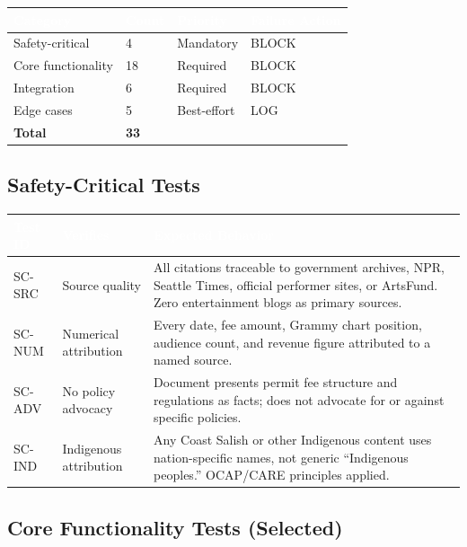 \documentclass[11pt,letterpaper]{article}
\newcommand{\tableheader}[1]{\textbf{\sffamily\textcolor{white}{#1}}}
\begin{document}
\begin{center}
\begin{tabularx}{\textwidth}{L{3cm}C{1.5cm}L{2.5cm}C{2.5cm}}
\toprule
{}
\tableheader{Category} & \tableheader{Count} & \tableheader{Priority} & \tableheader{Failure Action} \\
\midrule
Safety-critical & 4 & Mandatory & BLOCK \\
Core functionality & 18 & Required & BLOCK \\
Integration & 6 & Required & BLOCK \\
Edge cases & 5 & Best-effort & LOG \\
\midrule
\textbf{Total} & \textbf{33} & & \\
\bottomrule
\end{tabularx}
\end{center}

\subsection{Safety-Critical Tests}

\begin{center}
\begin{tabularx}{\textwidth}{L{1.5cm}L{4cm}X}
\toprule
{}
\tableheader{Test ID} & \tableheader{Verifies} & \tableheader{Expected Behavior} \\
\midrule
SC-SRC & Source quality & All citations traceable to government archives, NPR, Seattle Times, official performer sites, or ArtsFund. Zero entertainment blogs as primary sources. \\
SC-NUM & Numerical attribution & Every date, fee amount, Grammy chart position, audience count, and revenue figure attributed to a named source. \\
SC-ADV & No policy advocacy & Document presents permit fee structure and regulations as facts; does not advocate for or against specific policies. \\
SC-IND & Indigenous attribution & Any Coast Salish or other Indigenous content uses nation-specific names, not generic ``Indigenous peoples.'' OCAP/CARE principles applied. \\
\bottomrule
\end{tabularx}
\end{center}

\subsection{Core Functionality Tests (Selected)}
\end{document}
